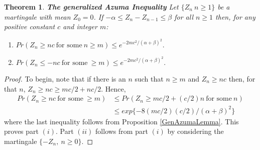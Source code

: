 \documentclass[a4paper,10pt]{article}
\theoremstyle{plain}
\newtheorem{thm}{Theorem}[section]
\theoremstyle{definition}
\theoremstyle{remark}
\begin{document}
\begin{thm}
\textbf{The generalized Azuma Inequality} Let $\{Z_n~ n \geq 1\}$ be a martingale with mean $Z_0=0$. If $-\alpha \leq Z_n-Z_{n-1} \leq \beta $ for all $n \geq 1$ then, for any positive constant $c$ and integer $m$:
\begin{enumerate}
\item $Pr(Z_n \geq nc ~ \text{for some}~ n \geq m) \leq e^{-2mc^2/{(\alpha+\beta)}^2}.$
\item $Pr(Z_n \leq -nc ~ \text{for some}~ \geq m) \leq e^{-2mc^2/{(\alpha+\beta)}^2}.$
\end{enumerate}
\end{thm}
\begin{proof}
To begin, note that if there is an $n$ such that $n \geq m$ and $Z_n \geq nc$ then, for that $n$, $Z_n \geq nc \geq mc/2+nc/2$. Hence,
\begin{eqnarray*}
Pr(Z_n \geq nc ~ \text{for some}~ \geq m) &\leq Pr(Z_n \geq mc/2+(c/2)n~ \text{for some} ~ n)\\
& \leq exp\{-8(mc/2)(c/2)/{(\alpha+\beta)}^2\}
\end{eqnarray*}
where the last inequality follows from Proposition \ref{GenAzumaLemma}. This proves part $(i)$. Part $(ii)$ follows from part $(i)$ by considering the martingale $\{-Z_n,~ n \geq 0\}$.
\end{proof}
\end{document}
